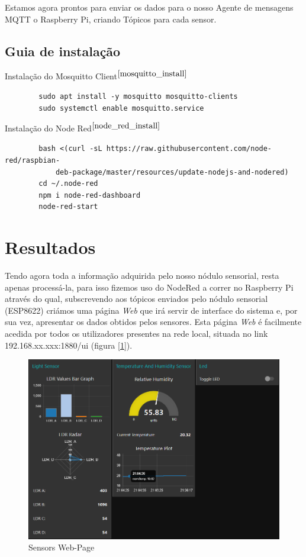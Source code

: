 \documentclass[12pt]{article}
\begin{document}
Estamos agora prontos para enviar os dados para o nosso Agente de mensagens MQTT o Raspberry Pi, criando Tópicos para cada sensor.

\subsection{Guia de instalação}

Instalação do Mosquitto Client$^{\cite{mosquitto_install}}$
\begin{verbatim}
        sudo apt install -y mosquitto mosquitto-clients
        sudo systemctl enable mosquitto.service
\end{verbatim}

Instalação do Node Red$^{\cite{node_red_install}}$
\begin{verbatim}
        bash <(curl -sL https://raw.githubusercontent.com/node-red/raspbian-
            deb-package/master/resources/update-nodejs-and-nodered)	
        cd ~/.node-red
        npm i node-red-dashboard
        node-red-start
\end{verbatim}

\newpage
\section{Resultados}

Tendo agora toda a informação adquirida pelo nosso nódulo sensorial, resta apenas processá-la, para isso fizemos uso do NodeRed a correr no Raspberry Pi através do qual, subscrevendo aos tópicos enviados pelo nódulo sensorial (ESP8622) criámos uma página \textit{Web} que irá servir de interface do sistema e, por sua vez, apresentar os dados obtidos pelos sensores. Esta página \textit{Web} é facilmente acedida por todos os utilizadores presentes na rede local, situada no link 192.168.xx.xxx:1880/ui (figura [\ref{fig:Node_Red_Interface}]).

\begin{figure}[H]
  \centering
     \includegraphics[width=0.7\linewidth]{imgs/SERVER_V04.png}
    \caption{Sensors Web-Page}
  \label{fig:Node_Red_Interface}
\end{figure}
\end{document}
